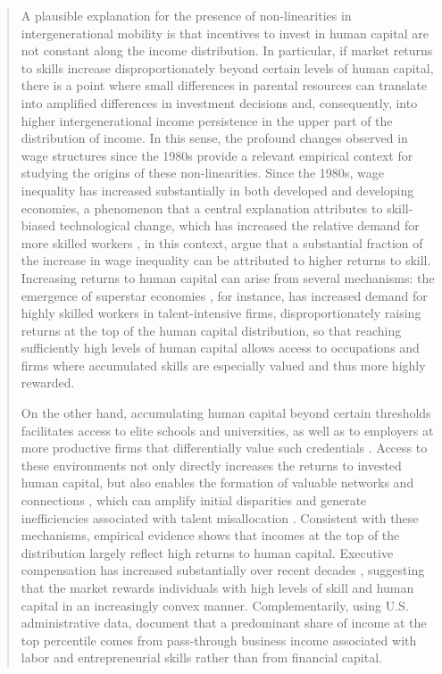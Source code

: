 \documentclass[12pt]{article}
\begin{document}
\begin{abstract}
A plausible explanation for the presence of non-linearities in intergenerational mobility is that incentives to invest in human capital are not constant along the income distribution. In particular, if market returns to skills increase disproportionately beyond certain levels of human capital, there is a point where small differences in parental resources can translate into amplified differences in investment decisions and, consequently, into higher intergenerational income persistence in the upper part of the distribution of income. In this sense, the profound changes observed in wage structures since the 1980s provide a relevant empirical context for studying the origins of these non-linearities. Since the 1980s, wage inequality has increased substantially in both developed and developing economies, a phenomenon that a central explanation attributes to skill-biased technological change, which has increased the relative demand for more skilled workers \parencite{Katz_1992,Krusell_2000,Card_2002,Buera_2021}, in this context, \textcite{Murphy_1993} argue that a substantial fraction of the increase in wage inequality can be attributed to higher returns to skill. Increasing returns to human capital can arise from several mechanisms: the emergence of superstar economies \parencite{Rosen_1983,Autor_2020}, for instance, has increased demand for highly skilled workers in talent-intensive firms, disproportionately raising returns at the top of the human capital distribution, so that reaching sufficiently high levels of human capital allows access to occupations and firms where accumulated skills are especially valued and thus more highly rewarded.

On the other hand, accumulating human capital beyond certain thresholds facilitates access to elite schools and universities, as well as to employers at more productive firms that differentially value such credentials \parencite{Dale_2002,Zimmerman_2019,Chetty_2025}. Access to these environments not only directly increases the returns to invested human capital, but also enables the formation of valuable networks and connections \parencite{Bavaro_2022}, which can amplify initial disparities and generate inefficiencies associated with talent misallocation \parencite{Bandyopadhyay_2019}. Consistent with these mechanisms, empirical evidence shows that incomes at the top of the distribution largely reflect high returns to human capital. Executive compensation has increased substantially over recent decades \parencite{Gabaix_2008}, suggesting that the market rewards individuals with high levels of skill and human capital in an increasingly convex manner. Complementarily, using U.S. administrative data, \textcite{Smith_2019} document that a predominant share of income at the top percentile comes from pass-through business income associated with labor and entrepreneurial skills rather than from financial capital.


\end{abstract}
\end{document}
